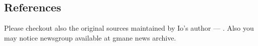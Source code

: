 \documentclass[11pt]{article}
\begin{document}
\subsection*{References}

Please checkout also the original  sources maintained by
Io's author --- . Also you may notice 
newsgroup available at gmane news archive.


\end{document}
